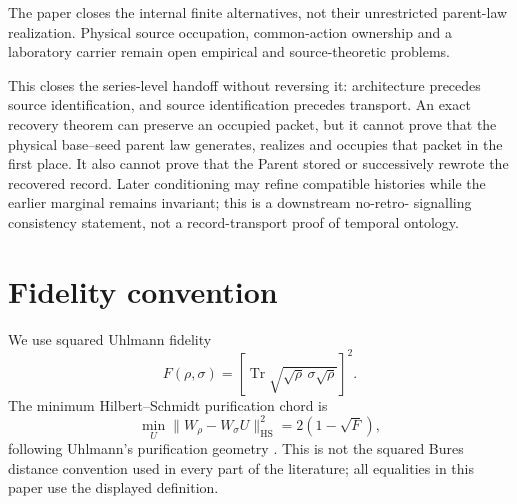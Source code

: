 \documentclass[11pt]{article}
\newcommand{\HS}{\mathrm{HS}}
\newcommand{\Tr}{\operatorname{Tr}}
\begin{document}
The paper closes the internal finite alternatives, not their unrestricted
parent-law realization.  Physical source occupation, common-action ownership and a
laboratory carrier remain open empirical and source-theoretic problems.

This closes the series-level handoff without reversing it: architecture
precedes source identification, and source identification precedes transport.
An exact recovery theorem can preserve an occupied packet, but it cannot prove
that the physical base--seed parent law generates, realizes and occupies that
packet in the first place.
It also cannot prove that the Parent stored or successively rewrote the
recovered record.  Later conditioning may refine compatible histories while
the earlier marginal remains invariant; this is a downstream no-retro-
signalling consistency statement, not a record-transport proof of temporal
ontology.

\appendix
\section{Fidelity convention}

We use squared Uhlmann fidelity
\begin{equation}
 F(\rho,\sigma)=\left[\Tr\sqrt{\sqrt\rho\,\sigma\sqrt\rho}\right]^2.
\end{equation}
The minimum Hilbert--Schmidt purification chord is
\begin{equation}
 \min_U\lVert W_\rho-W_\sigma U\rVert_{\HS}^2
 =2(1-\sqrt F),
\end{equation}
following Uhlmann's purification geometry \cite{Uhlmann1976}.  This is not the
squared Bures distance convention used in every part of the literature; all
equalities in this paper use the displayed definition.




\end{document}
